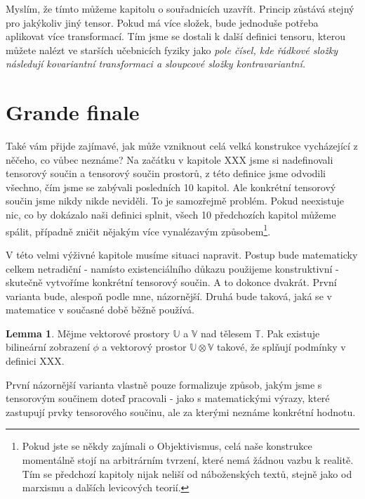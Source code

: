 \documentclass[a5paper,12pt]{amsbook}
\theoremstyle{definition}
\newtheorem{lemma}[theorem]{Lemma}
\newcommand{\myspace}[1]{\mathbb{#1}}
\begin{document}
\noindent
Myslím, že tímto můžeme kapitolu o souřadnicích uzavřít. Princip zůstává stejný
pro jakýkoliv jiný tensor. Pokud má více složek, bude jednoduše potřeba aplikovat
více transformací. Tím jsme se dostali k další definici tensoru, kterou můžete
nalézt ve starších učebnicích fyziky jako \textit{pole čísel, kde řádkové složky
následují kovariantní transformaci a sloupcové složky kontravariantní.}

\section{Grande finale}

\noindent
Také vám přijde zajímavé, jak může vzniknout celá velká konstrukce vycházející
z něčeho, co vůbec neznáme? Na začátku v kapitole XXX jsme si nadefinovali
tensorový součin a tensorový součin prostorů, z této definice jsme odvodili
všechno, čím jsme se zabývali posledních 10 kapitol. Ale konkrétní tensorový
součin jsme nikdy nikde neviděli. To je samozřejmě problém. Pokud neexistuje
nic, co by dokázalo naši definici splnit, všech 10 předchozích kapitol můžeme
spálit, případně zničit nějakým více vynalézavým způsobem\footnote{
	Pokud jste se někdy zajímali o Objektivismus, celá naše konstrukce momentálně
	stojí na arbitrárním tvrzení, které nemá žádnou vazbu k realitě. Tím se
	předchozí kapitoly nijak neliší od náboženských textů, stejně jako od
	marxismu a dalších levicových teorií.
}.

V této velmi výživné kapitole musíme situaci napravit. Postup bude matematicky
celkem netradiční - namísto existenciálního důkazu použijeme konstruktivní -
skutečně vytvoříme konkrétní tensorový součin. A to dokonce dvakrát. První
varianta bude, alespoň podle mne, názornější. Druhá bude taková, jaká se
v matematice v současné době běžně používá.

\begin{lemma}
Mějme vektorové prostory $\myspace{U}$ a $\myspace{V}$ nad tělesem $\myspace{T}$.
Pak existuje bilineární zobrazení $\phi$ a vektorový prostor
$\myspace{U}\otimes\myspace{V}$ takové, že splňují podmínky v definici XXX.
\end{lemma}

\noindent
První názornější varianta vlastně pouze formalizuje způsob, jakým jsme s tensorovým
součinem doteď pracovali - jako s matematickými výrazy, které zastupují prvky
tensorového součinu, ale za kterými neznáme konkrétní hodnotu.
\end{document}
